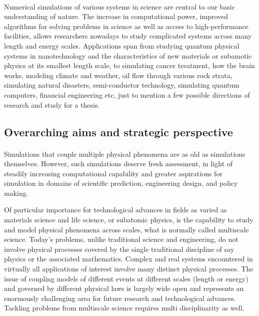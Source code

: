 \documentclass[%
twoside,                 %
final,                   %
10pt]{article}
\begin{document}
\paragraph{}


Numerical simulations of various systems in science are central to our
basic understanding of nature.  The increase in computational power,
improved algorithms for solving problems in science as well as access
to high-performance facilities, allows researchers nowadays to study
complicated systems across many length and energy scales. Applications
span from studying quantum physical systems in nanotechnology and the
characteristics of new materials or subamotic physics at its smallest
length scale, to simulating cancer treatment, how the brain works,
modeling climate and weather, oil flow through various rock strata,
simulating natural disasters, semi-conductor technology, simulating
quantum computers, financial engineering etc, just to mention a few
possible directions of research and study for a thesis.




\subsection{Overarching aims and strategic perspective}

\paragraph{}

Simulations that couple multiple physical phenomena are
as old as simulations themselves. However, such
simulations deserve fresh assessment, in light of steadily
increasing computational capability and greater aspirations
for simulation in domains of scientific prediction, engineering
design, and policy making.

Of particular importance for technological advances in fields as varied as materials science and life science, or subatomic physics, is the capability to study and model physical phenomena across scales, what is normally called multiscale science.
Today's problems, unlike traditional science and engineering, do not  involve physical processes covered by the single traditional discipline of say physics or the associated mathematics. Complex and real systems encountered  in virtually all applications of interest involve many distinct physical processes. 
The issue of coupling models of different events at different scales (length or energy) and governed by different physical laws is largely wide open and represents an enormously challenging area for future research and technological advances.  Tackling problems from multiscale science requires multi disciplinarity as well.
\end{document}
